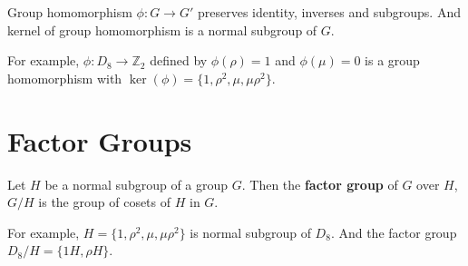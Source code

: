 \begin{remark}
	Group homomorphism $\phi : G \to G'$ preserves identity, inverses and subgroups. And kernel of group homomorphism is a normal subgroup of $G$.%
\end{remark}
\begin{remark}
	For example, $\phi : D_8 \to \mathbb{Z}_2$ defined by $\phi(\rho) = 1$ and $\phi(\mu) = 0$ is a group homomorphism with $\ker(\phi) = \{ 1,\rho^2,\mu,\mu\rho^2 \}$.
\end{remark}
\pagebreak

\section{Factor Groups}
\begin{remark}
	Let $H$ be a normal subgroup of a group $G$. Then the \textbf{factor group} of $G$ over $H$, $G/H$ is the group of cosets of $H$ in $G$.
\end{remark}

\begin{remark}
	For example, $H = \{ 1,\rho^2,\mu,\mu\rho^2 \}$ is normal subgroup of $D_8$. And the factor group $D_8/H = \{ 1H,\rho H \}$.
\end{remark}

